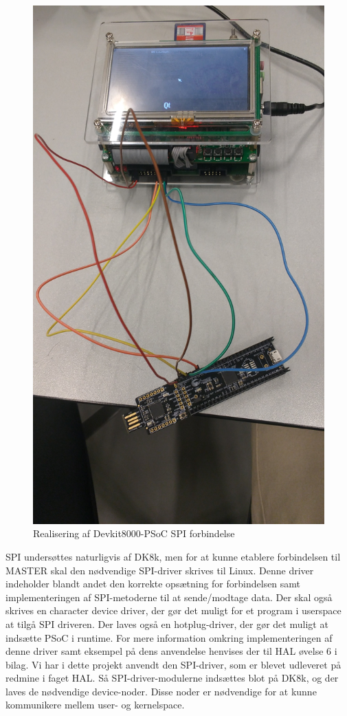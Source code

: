 \begin{figure}[H]
\includegraphics[scale=0.15]{Screenshots/Realisering_devkit_psoc}
\caption{Realisering af Devkit8000-PSoC SPI forbindelse}
\end{figure}

SPI undersøttes naturligvis af DK8k, men for at kunne etablere forbindelsen til MASTER skal den nødvendige SPI-driver skrives til Linux. 
Denne driver indeholder blandt andet den korrekte opsætning for forbindelsen samt implementeringen af SPI-metoderne til at sende/modtage data.
Der skal også skrives en character device driver, der gør det muligt for et program i userspace at tilgå SPI driveren. Der laves også en hotplug-driver,
der gør det muligt at indsætte PSoC i runtime. For mere information omkring implementeringen af denne driver samt eksempel på dens anvendelse henvises der til HAL 
øvelse 6 i bilag.
Vi har i dette projekt anvendt den SPI-driver, som er blevet udleveret på redmine i faget HAL. Så SPI-driver-modulerne indsættes blot på DK8k, og der 
laves de nødvendige device-noder. Disse noder er nødvendige for at kunne kommunikere mellem user- og kernelspace. 

